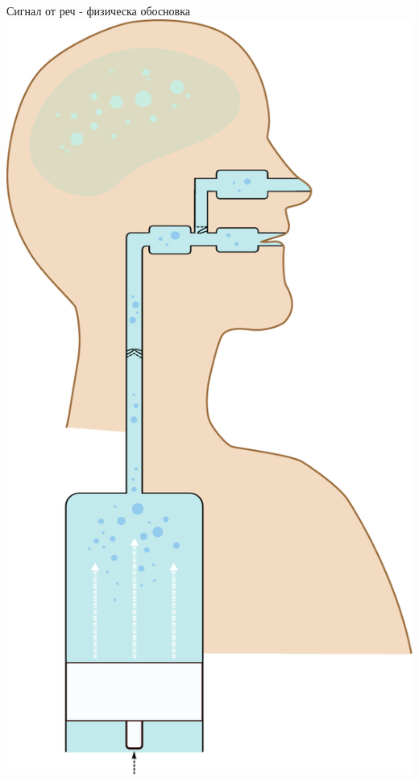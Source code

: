 \documentclass[9pt]{beamer}
\begin{document}
\begin{frame}{Сигнал от реч - физическа обосновка}
        \includegraphics[width=0.28\paperwidth]{tubes}%
    \end{frame}
\end{document}
